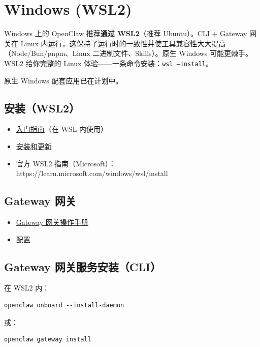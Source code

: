 \clearpage

\section{Windows (WSL2)}


Windows 上的 OpenClaw 推荐\textbf{通过 WSL2}（推荐 Ubuntu）。CLI + Gateway 网关在 Linux 内运行，这保持了运行时的一致性并使工具兼容性大大提高（Node/Bun/pnpm、Linux 二进制文件、Skills）。原生 Windows 可能更棘手。WSL2 给你完整的 Linux 体验——一条命令安装：\texttt{wsl --install}。

原生 Windows 配套应用已在计划中。

\subsection{安装（WSL2）}


\begin{itemize}
  \item \href{/start/getting-started}{入门指南}（在 WSL 内使用）
  \item \href{/install/updating}{安装和更新}
  \item 官方 WSL2 指南（Microsoft）：https://learn.microsoft.com/windows/wsl/install
\end{itemize}


\subsection{Gateway 网关}


\begin{itemize}
  \item \href{/gateway}{Gateway 网关操作手册}
  \item \href{/gateway/configuration}{配置}
\end{itemize}


\subsection{Gateway 网关服务安装（CLI）}


在 WSL2 内：

\begin{lstlisting}
openclaw onboard --install-daemon
\end{lstlisting}


或：

\begin{lstlisting}
openclaw gateway install
\end{lstlisting}


